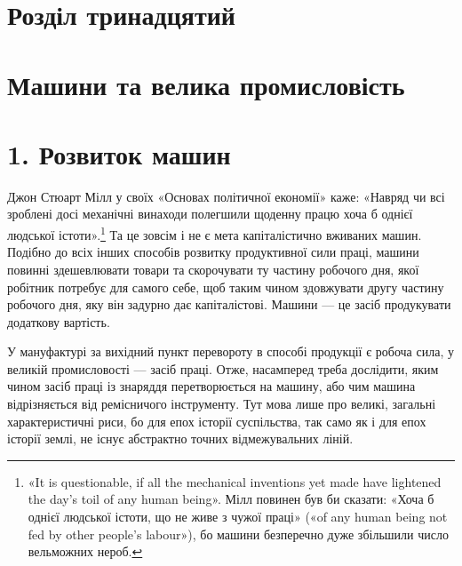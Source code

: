 
\section*{Розділ тринадцятий}

\section*{Машини та велика промисловість}

\section*{1. Розвиток машин}

Джон Стюарт Мілл у своїх «Основах політичної економії»
каже: «Навряд чи всі зроблені досі механічні винаходи полегшили
щоденну працю хоча б однієї людської істоти».\footnote{
«It is questionable, if all the mechanical inventions yet made have
lightened the day’s toil of any human being». Мілл повинен був би сказати:
«Хоча б однієї людської істоти, що не живе з чужої праці» («of any human
being not fed by other people’s labour»), бо машини безперечно дуже збільшили
число вельможних нероб.
} Та це зовсім і не є мета капіталістично вживаних машин. Подібно до
всіх інших способів розвитку продуктивної сили праці, машини
повинні здешевлювати товари та скорочувати ту частину робочого
дня, якої робітник потребує для самого себе, щоб таким
чином здовжувати другу частину робочого дня, яку він задурно
дає капіталістові. Машини — це засіб продукувати додаткову
вартість.

У мануфактурі за вихідний пункт перевороту в способі продукції
є робоча сила, у великій промисловості — засіб праці.
Отже, насамперед треба дослідити, яким чином засіб праці із
знаряддя перетворюється на машину, або чим машина відрізняється
від ремісничого інструменту. Тут мова лише про великі,
загальні характеристичні риси, бо для епох історії суспільства,
так само як і для епох історії землі, не існує абстрактно точних
відмежувальних ліній.

